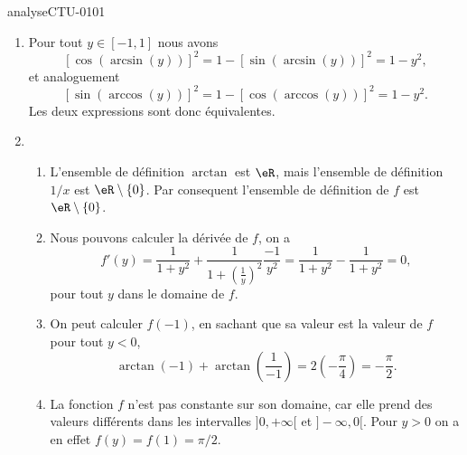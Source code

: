 
\begin{corrige}{analyseCTU-0101}

   \begin{enumerate}
      \item Pour tout $y \in [-1,1]$ nous avons 
        \begin{equation*}
          \left[\cos (\arcsin(y)) \right]^2 = 1 -  \left[\sin (\arcsin(y)) \right]^2 = 1- y^2,
        \end{equation*}
et analoguement 
 \begin{equation*}
          \left[ \sin(\arccos(y))\right]^2 = 1 -  \left[\cos(\arccos(y))\right]^2 = 1- y^2.
        \end{equation*}
 Les deux expressions sont donc \'equivalentes. 
        \item
            \begin{enumerate}
            \item L'ensemble de définition $\arctan$ est $\eR$, mais l'ensemble de  définition $1/x$ est $\eR\setminus\{0\}$. Par consequent l'ensemble de définition de $f$ est $\eR\setminus\{0\}$.
              \item Nous pouvons calculer la dérivée de $f$, on a  
                \begin{equation*}
                  f'(y) = \frac{1}{1+y^2} + \frac{1}{1+\left(\frac{1}{y}\right)^2}\frac{-1}{y^2} = \frac{1}{1+y^2} - \frac{1}{1+y^2} = 0,
                \end{equation*}
pour tout $y$ dans le domaine de $f$.
              \item On peut calculer $f(-1)$, en sachant que sa valeur est la valeur de $f$ pour tout \( y<0\),
            \begin{equation}
                \arctan(-1)+\arctan(\frac{1}{ -1 })= 2 \left(-\frac{ \pi }{ 4 }\right) = -\frac{ \pi }{ 2 }.
            \end{equation}
          \item La fonction $f$ n'est pas constante sur son domaine, car elle prend des valeurs diff\'erents dans les intervalles $]0,+\infty[$ et $]-\infty, 0[$. Pour $y>0$ on a en effet $f(y) = f(1) = \pi/2$.  
            \end{enumerate}
    \end{enumerate}

\end{corrige}
